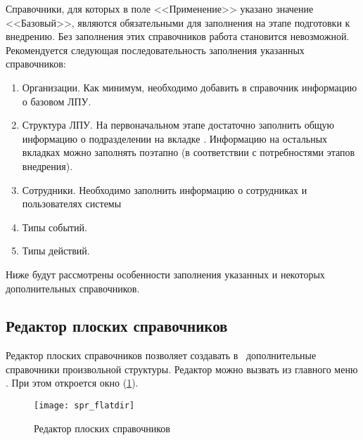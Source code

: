 Справочники, для которых в поле <<Применение>> указано значение <<Базовый>>, являются обязательными для заполнения на этапе подготовки к внедрению. Без заполнения этих справочников работа \tmis становится невозможной. Рекомендуется следующая последовательность заполнения указанных справочников:
\begin{enumerate}
 \item Организации. Как минимум, необходимо добавить в справочник информацию о базовом ЛПУ.
 \item Структура ЛПУ. На первоначальном этапе достаточно заполнить общую информацию о подразделении на вкладке . Информацию на остальных вкладках можно заполнять поэтапно (в соответствии с потребностями этапов внедрения).
 \item Сотрудники. Необходимо заполнить информацию о сотрудниках и пользователях системы
 \item Типы событий.
 \item Типы действий.
\end{enumerate}
 
Ниже будут рассмотрены особенности заполнения указанных и некоторых дополнительных справочников.

\subsection{Редактор плоских справочников}

Редактор плоских справочников позволяет создавать в \tmis~дополнительные справочники произвольной структуры. Редактор можно вызвать из главного меню . При этом откроется окно (\ref{img_spr_flatdir}).

\begin{figure}[ht]\centering
 \texttt{[image: spr\_flatdir]}
 \caption{Редактор плоских справочников}
 \label{img_spr_flatdir}
\end{figure} 

